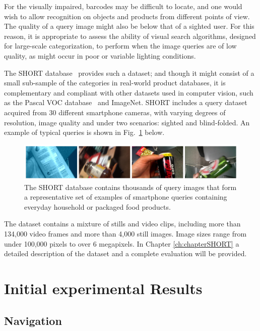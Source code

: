 For the visually impaired, barcodes may be difficult to locate, and one would wish to allow recognition on objects and products from different points of view. The quality of a query image might also be below that of a sighted user.  For this reason, it is appropriate to assess the ability of visual search algorithms, designed for large-scale categorization, to perform when the image queries are of low quality, as might occur in poor or variable lighting conditions.

The SHORT database~\cite{Rivera-Rubio2013a} provides such a dataset; and though it might consist of a small sub-sample of the categories in real-world product databases, it is  complementary and compliant with other datasets used in computer vision, such as the Pascal VOC database~\cite{Everingham2009} and ImageNet.  SHORT includes a query dataset acquired from 30 different smartphone cameras, with varying degrees of resolution, image quality and under two scenarios: sighted and blind-folded.  An example of typical queries is shown in Fig.~\ref{fig:ShortQueries} below.

\begin{figure}
\centering
\includegraphics[width=\textwidth]{./gfx/Chapter02/TestDatasetCollage4imgs.jpg}
\caption{The SHORT database contains thousands of query images that form a representative set of examples of smartphone queries containing everyday household or packaged food products.}
\label{fig:ShortQueries}
\end{figure}

The dataset contains a mixture of stills and video clips, including more than 134,000 video frames and more than 4,000 still images.  Image sizes range from under 100,000 pixels to over 6 megapixels. In Chapter \ref{ch:chapterSHORT} a detailed description of the dataset and a complete evaluation will be provided.



\section{Initial experimental Results} \label{sec:expResults}

\subsection{Navigation}

